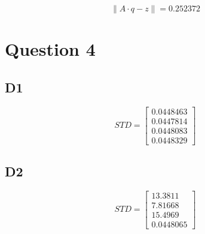 \begin{equation}
\left\| A\cdot q-z \right\| = 0.252372
\label{eq:} 
\end{equation}





\section*{Question 4}
\subsection*{D1}
\begin{equation}
STD=\begin{bmatrix} 0.0448463 \\ 0.0447814 \\ 0.0448083 \\ 0.0448329  \end{bmatrix}
\label{eq:} 
\end{equation}


\subsection*{D2}
\begin{equation}
STD=\begin{bmatrix} 13.3811 \\ 7.81668 \\ 15.4969 \\ 0.0448065  \end{bmatrix}
\label{eq:} 
\end{equation}



